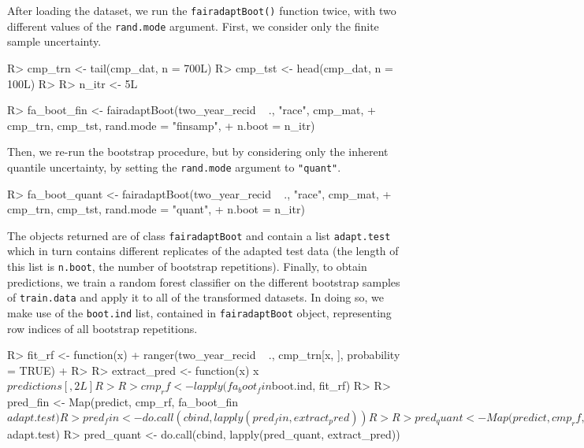 \documentclass[
  nojss]{jss}
\begin{document}
After loading the dataset, we run the \texttt{fairadaptBoot()} function
twice, with two different values of the \texttt{rand.mode} argument.
First, we consider only the finite sample uncertainty.

\begin{CodeChunk}
\begin{CodeInput}
R> cmp_trn <- tail(cmp_dat, n = 700L)
R> cmp_tst <- head(cmp_dat, n = 100L)
R> 
R> n_itr <- 5L
\end{CodeInput}
\end{CodeChunk}

\begin{CodeChunk}
\begin{CodeInput}
R> fa_boot_fin <- fairadaptBoot(two_year_recid ~ ., "race", cmp_mat,
+                              cmp_trn, cmp_tst, rand.mode = "finsamp",
+                              n.boot = n_itr)
\end{CodeInput}
\end{CodeChunk}

Then, we re-run the bootstrap procedure, but by considering only the
inherent quantile uncertainty, by setting the \texttt{rand.mode}
argument to \texttt{"quant"}.

\begin{CodeChunk}
\begin{CodeInput}
R> fa_boot_quant <- fairadaptBoot(two_year_recid ~ ., "race", cmp_mat,
+                                cmp_trn, cmp_tst, rand.mode = "quant",
+                                n.boot = n_itr)
\end{CodeInput}
\end{CodeChunk}

The objects returned are of class \texttt{fairadaptBoot} and contain a
list \texttt{adapt.test} which in turn contains different replicates of
the adapted test data (the length of this list is \texttt{n.boot}, the
number of bootstrap repetitions). Finally, to obtain predictions, we
train a random forest classifier on the different bootstrap samples of
\texttt{train.data} and apply it to all of the transformed datasets. In
doing so, we make use of the \texttt{boot.ind} list, contained in
\texttt{fairadaptBoot} object, representing row indices of all bootstrap
repetitions.

\begin{CodeChunk}
\begin{CodeInput}
R> fit_rf <- function(x) {
+   ranger(two_year_recid ~ ., cmp_trn[x, ], probability = TRUE)
+ }
R> 
R> extract_pred <- function(x) x$predictions[, 2L]
R> 
R> cmp_rf <- lapply(fa_boot_fin$boot.ind, fit_rf)
R> 
R> pred_fin <- Map(predict, cmp_rf, fa_boot_fin$adapt.test)
R> pred_fin <- do.call(cbind, lapply(pred_fin, extract_pred))
R> 
R> pred_quant <- Map(predict, cmp_rf, fa_boot_quant$adapt.test)
R> pred_quant <- do.call(cbind, lapply(pred_quant, extract_pred))
\end{CodeInput}
\end{CodeChunk}
\end{document}
